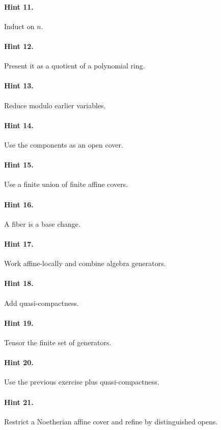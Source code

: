 \paragraph{Hint 11.} Induct on $n$.

\paragraph{Hint 12.} Present it as a quotient of a polynomial ring.

\paragraph{Hint 13.} Reduce modulo earlier variables.

\paragraph{Hint 14.} Use the components as an open cover.

\paragraph{Hint 15.} Use a finite union of finite affine covers.

\paragraph{Hint 16.} A fiber is a base change.

\paragraph{Hint 17.} Work affine-locally and combine algebra generators.

\paragraph{Hint 18.} Add quasi-compactness.

\paragraph{Hint 19.} Tensor the finite set of generators.

\paragraph{Hint 20.} Use the previous exercise plus quasi-compactness.

\paragraph{Hint 21.} Restrict a Noetherian affine cover and refine by distinguished opens.

